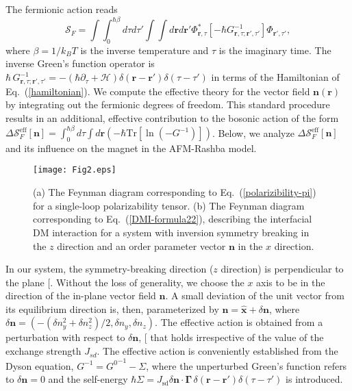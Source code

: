 \documentclass[aps,prl,twocolumn,amsmath,amssymb,superscriptaddress]{revtex4}%
\renewcommand{\cite}[1]{{[}\onlinecite{#1}{]}}
\newcommand{\be}{\begin{equation}}
\newcommand{\e}{\end{equation}}
\newcommand{\bb}{\boldsymbol}
\begin{document}
The fermionic action reads
\be
\mathcal{S}_F\!=\!\int\!\!\!\int_0^{\hbar\beta}\!\!d\tau d\tau'\!\! \int\!\!\!\int\! d{\bm{r}} d{\bm{r}}' \Phi^*_{\bm{r},\tau} [-\hbar  G^{-1}_{\bm{r},\tau;\bm{r}',\tau'}] \Phi_{\bm{r}',\tau'},
\e
where $\beta=1/k_B T$ is the inverse temperature and $\tau$ is the imaginary time. The inverse Green's function operator is  $\hbar\, G^{-1}_{\bm{r},\tau;\bm{r}',\tau'}=-\left(\hbar{\partial_\tau}+\mathcal{H}\right)\delta(\bm{r}-\bm{r}')\delta(\tau-\tau')$ in terms of the Hamiltonian of Eq.~(\ref{hamiltonian}). We compute the effective theory for the vector field $\bb{n}(\bb{r})$ by integrating out the fermionic degrees of freedom. This standard procedure results in an additional, effective contribution to the bosonic action of the form $\Delta \mathcal{S}_F^{\mathrm{eff}}[\bm{n}]=\int_0^{\hbar\beta} d\tau \int d{\bm{r}} \left(-\hbar \mathrm{Tr}[\ln(-G^{-1})]\right)$. Below, we analyze $\Delta \mathcal{S}_F^{\mathrm{eff}}[\bm{n}]$ and its influence on the magnet in the AFM-Rashba model.

\begin{figure}[t]
\texttt{[image: Fig2.eps]}
\caption{ (a) The Feynman diagram corresponding to Eq.~(\ref{polarizibility-pi}) for a single-loop polarizability tensor. (b) The Feynman diagram corresponding to Eq.~(\ref{DMI-formula22}), describing the interfacial DM interaction for a system with inversion symmetry breaking in the $z$ direction and an order parameter vector $\bm{n}$ in the $x$ direction.}
\label{fig:diag}
\end{figure}

In our system, the symmetry-breaking direction ($z$ direction) is perpendicular to the plane \cite{iDMI-exp3}. Without the loss of generality, we choose the $x$ axis to be in the direction of the in-plane vector field $\bb{n}$. A small deviation of the unit vector from its equilibrium direction is, then, parameterized by $\bm{n}=\hat{\bb{x}}+\delta\bm{n}$, where $\delta\bm{n}=\left( -(\delta n^2_y+\delta n^2_z)/2, \delta n_y, \delta n_z \right)$. The effective action is obtained from a perturbation with respect to $\delta \bb{n}$, \cite{sd-model-referee-suggested} that holds irrespective of the value of the exchange strength $J_{sd}$. The effective action is conveniently established from the Dyson equation, $G^{-1}={G^0}^{-1}-\Sigma$, where the unperturbed Green's function refers to $\delta\bb{n}=0$ and the self-energy $\hbar \Sigma=J_{\mathrm{sd}}\delta\bm{n}\cdot\bm{\Gamma}\, \delta(\bm{r}-\bm{r}')\delta(\tau-\tau')$ is introduced.
\end{document}
